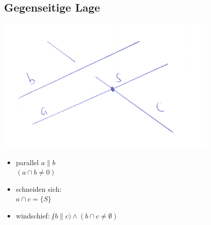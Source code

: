 \newpage
\subsection{Gegenseitige Lage}
\begin{center}
	 \includegraphics[width=0.8\textwidth]{imgs/gegenseitige_lage.png}
 \end{center}
\begin{itemize}
	\item
	parallel $a \parallel b$\\
	$(a \cap b \not = 0)$
	\item
	schneiden sich: \\
	$a \cap c = \{S\}$
	\item
	windschief:
	$\not (b \parallel c) \land (b \cap c \not = \emptyset)$
\end{itemize}
\newpage
